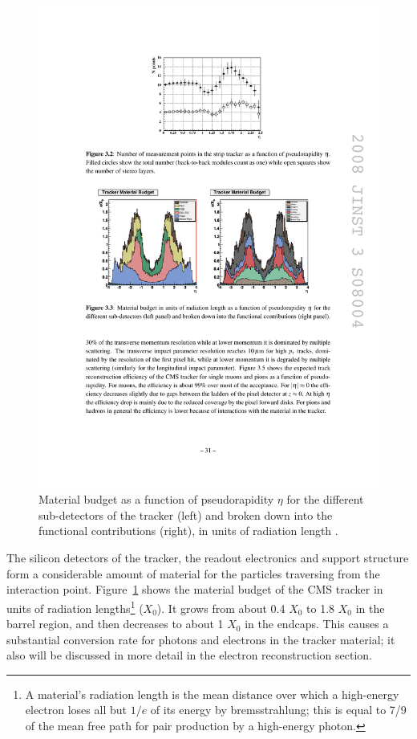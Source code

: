 \begin{figure}[!htbp]
  \begin{center}
    \leavevmode
    \includegraphics[width=\columnwidth]{tracker_material_budget}
    \caption{Material budget as a function of pseudorapidity $\eta$ for the different sub-detectors of the tracker
    (left) and broken down into the functional contributions (right), in units of radiation length \cite{CMS}.}
    \label{tracker_material_budget}
  \end{center}
\end{figure}

The silicon detectors of the tracker, the readout electronics and support structure form a considerable amount of
material for the particles traversing from the interaction point. Figure~\ref{tracker_material_budget} \cite{CMS} shows
the material budget of the CMS tracker in units of radiation lengths\footnote{A material's radiation length is the mean
distance over which a high-energy electron loses all but $1/e$ of its energy by bremsstrahlung; this is equal to
\num{7/9} of the mean free path for pair production by a high-energy photon.} ($X_0$). It grows from about \num{0.4}
$X_0$ to \num{1.8} $X_0$ in the barrel region, and then decreases to about \num{1} $X_0$ in the endcaps. This causes a
substantial conversion rate for photons and electrons in the tracker material; it also will be discussed in more detail
in the electron reconstruction section.

